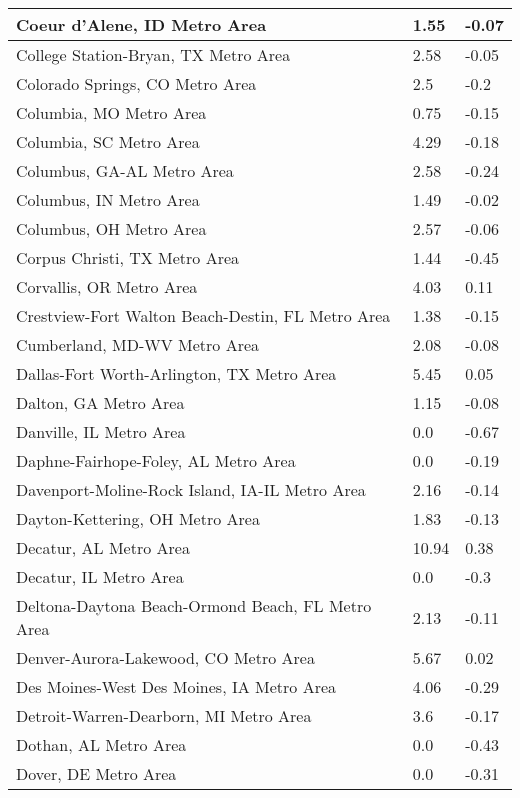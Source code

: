 \documentclass[12pt,oneside, letterpaper]{book}
\begin{document}
\begin{longtable}{| p{} | p{} | p{} |}
    Coeur d'Alene, ID Metro Area & 1.55 & -0.07 \\ \hline
    College Station-Bryan, TX Metro Area & 2.58 & -0.05 \\ \hline
    Colorado Springs, CO Metro Area & 2.5 & -0.2 \\ \hline
    Columbia, MO Metro Area & 0.75 & -0.15 \\ \hline
    Columbia, SC Metro Area & 4.29 & -0.18 \\ \hline
    Columbus, GA-AL Metro Area & 2.58 & -0.24 \\ \hline
    Columbus, IN Metro Area & 1.49 & -0.02 \\ \hline
    Columbus, OH Metro Area & 2.57 & -0.06 \\ \hline
    Corpus Christi, TX Metro Area & 1.44 & -0.45 \\ \hline
    Corvallis, OR Metro Area & 4.03 & 0.11 \\ \hline
    Crestview-Fort Walton Beach-Destin, FL Metro Area & 1.38 & -0.15 \\ \hline
    Cumberland, MD-WV Metro Area & 2.08 & -0.08 \\ \hline
    Dallas-Fort Worth-Arlington, TX Metro Area & 5.45 & 0.05 \\ \hline
    Dalton, GA Metro Area & 1.15 & -0.08 \\ \hline
    Danville, IL Metro Area & 0.0 & -0.67 \\ \hline
    Daphne-Fairhope-Foley, AL Metro Area & 0.0 & -0.19 \\ \hline
    Davenport-Moline-Rock Island, IA-IL Metro Area & 2.16 & -0.14 \\ \hline
    Dayton-Kettering, OH Metro Area & 1.83 & -0.13 \\ \hline
    Decatur, AL Metro Area & 10.94 & 0.38 \\ \hline
    Decatur, IL Metro Area & 0.0 & -0.3 \\ \hline
    Deltona-Daytona Beach-Ormond Beach, FL Metro Area & 2.13 & -0.11 \\ \hline
    Denver-Aurora-Lakewood, CO Metro Area & 5.67 & 0.02 \\ \hline
    Des Moines-West Des Moines, IA Metro Area & 4.06 & -0.29 \\ \hline
    Detroit-Warren-Dearborn, MI Metro Area & 3.6 & -0.17 \\ \hline
    Dothan, AL Metro Area & 0.0 & -0.43 \\ \hline
    Dover, DE Metro Area & 0.0 & -0.31 \\ \hline

\end{longtable}
\end{document}
